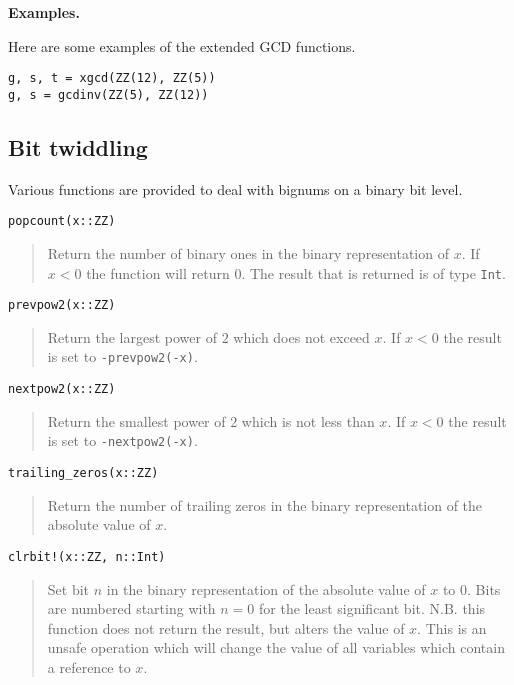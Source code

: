\documentclass[a4paper,10pt]{article}
\newcommand{\code}{\lstinline}
\newcommand{\desc}[1]{\vspace{-3mm}\begin{quote}#1\end{quote}}
\begin{document}
{{{\textbf{Examples.}

Here are some examples of the extended GCD functions.

\begin{lstlisting}
g, s, t = xgcd(ZZ(12), ZZ(5))
g, s = gcdinv(ZZ(5), ZZ(12))
\end{lstlisting}

\subsection{Bit twiddling}

Various functions are provided to deal with bignums on a binary bit level.

\begin{lstlisting}
popcount(x::ZZ)
\end{lstlisting}

\desc{Return the number of binary ones in the binary representation of $x$. If $x < 0$ the
function will return $0$. The result that is returned is of type \code{Int}.}

\begin{lstlisting}
prevpow2(x::ZZ)
\end{lstlisting}

\desc{Return the largest power of $2$ which does not exceed $x$. If $x < 0$ the result is
set to \code{-prevpow2(-x)}.}

\begin{lstlisting}
nextpow2(x::ZZ)
\end{lstlisting}

\desc{Return the smallest power of $2$ which is not less than $x$. If $x < 0$ the result is
set to \code{-nextpow2(-x)}.}

\begin{lstlisting}
trailing_zeros(x::ZZ)
\end{lstlisting}

\desc{Return the number of trailing zeros in the binary representation of the absolute
value of $x$.}

\begin{lstlisting}
clrbit!(x::ZZ, n::Int)
\end{lstlisting}

\desc{Set bit $n$ in the binary representation of the absolute value of $x$ to $0$. Bits
are numbered starting with $n = 0$ for the least significant bit. N.B. this function does
not return the result, but alters the value of $x$. This is an unsafe operation which will
change the value of all variables which contain a reference to $x$.}

}}}
\end{document}
